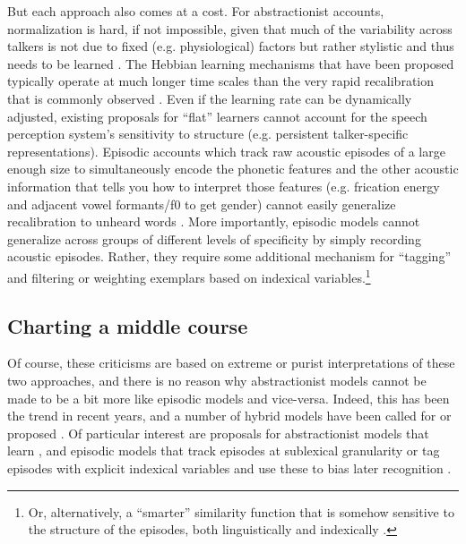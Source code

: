 But each approach also comes at a cost. For abstractionist accounts, normalization is hard, if not impossible, given that much of the variability across talkers is not due to fixed (e.g. physiological) factors but rather stylistic and thus needs to be learned \autocite{Johnson2006,Pardo2006}.  The Hebbian learning mechanisms that have been proposed typically operate at much longer time scales than the very rapid recalibration that is commonly observed \autocite{Guediche2014,Mirman2006}.  Even if the learning rate can be dynamically adjusted, existing proposals for ``flat'' learners cannot account for the speech perception system's sensitivity to structure (e.g. persistent talker-specific representations).  Episodic accounts which track raw acoustic episodes of a large enough size to simultaneously encode the phonetic features and the other acoustic information that tells you how to interpret those features (e.g. frication energy and adjacent vowel formants/f0 to get gender) cannot easily generalize recalibration to unheard words \autocite{Cutler2010}. More importantly, episodic models cannot generalize across groups of different levels of specificity by simply recording acoustic episodes.  Rather, they require some additional mechanism for ``tagging'' and filtering or weighting exemplars based on indexical variables.\footnote{Or, alternatively, a ``smarter'' similarity function that is somehow sensitive to the structure of the episodes, both linguistically and indexically \autocite[e.g., as discussed above,][]{VandenBosch2013}.}

\subsection{Charting a middle course}
\label{sec:chart-middle-course}
\label{r3-abs-epi-converge}

Of course, these criticisms are based on extreme or purist interpretations of these two approaches, and there is no reason why abstractionist models cannot be made to be a bit more like episodic models and vice-versa.  Indeed, this has been the trend in recent years, and a number of hybrid models have been called for or proposed \autocite[e.g.,][]{Ernestus2014,Goldinger2007,McLennan2003}.  Of particular interest are proposals for abstractionist models that learn \autocite{Lancia2013,Mirman2006}, and episodic models that track episodes at sublexical granularity \autocite{Pierrehumbert2006} or tag episodes with explicit indexical variables and use these to bias later recognition \autocite{Johnson2006,Johnson2013}. 

